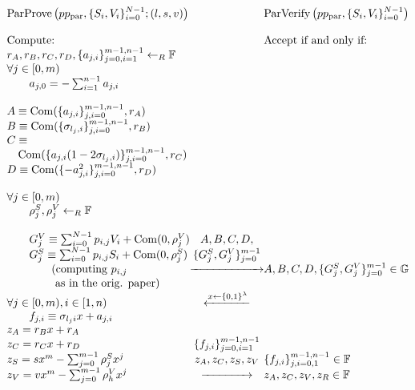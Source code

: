 \documentclass{llncs}
\newcommand{\G}{\mathbb{G}}
\newcommand{\F}{\mathbb{F}}
\newcommand{\com}{\operatorname{Com}}
\begin{document}
\begin{figure}
\centering
\begin{math}
\begin{array}{@{}l@{}c@{}l@{}}
\displaystyle \text{ParProve}\left(pp_{\text{par}}, \{S_i, V_i\}_{i=0}^{N-1}; (l,s,v)\right) && \text{ParVerify}\left(pp_{\text{par}}, \{S_i, V_i\}_{i=0}^{N-1}\right) \\\\
\text{Compute:} && \text{Accept if and only if:}\\
r_A, r_B, r_C, r_D, \{a_{j,i}\}_{j=0,i=1}^{m-1,n-1} \gets_R \F\\
\forall j \in [0,m) \\
\qquad a_{j,0} = -\sum _{i=1}^{n-1}a_{j,i}\\\\
A \equiv \com(\{a_{j,i}\}_{j,i=0}^{m-1,n-1}, r_A) \\
B \equiv \com(\{\sigma_{l_{j},i}\}_{j,i=0}^{m-1,n-1}, r_B) \\
C \equiv \\ \quad \com(\lbrace a_{j,i}(1-2\sigma_{l_j,i})\rbrace_{j,i=0}^{m-1,n-1}, r_C) \\
D \equiv \com(\{-a_{j,i}^2\}_{j,i=0}^{m-1,n-1}, r_D) \\\\
\forall j \in [0,m) &    \\
\qquad \rho^S_j, \rho^V_j \gets_R \F &\\\\

\qquad G^V_j \equiv \sum_{i=0}^{N-1}p_{i,j}V_i + \com(0, \rho^V_j )    &  A,B,C,D, & \\
\qquad G^S_j \equiv \sum_{i=0}^{N-1}p_{i,j}S_i + \com(0, \rho^S_j)& \lbrace G^S_j, G^V_j \rbrace_{j=0}^{m-1} \\
\qquad \qquad \text{(computing } p_{i,j}  & \xrightarrow{\qquad \qquad \qquad} & A, B, C, D, \{G^S_j, G^V_j\}_{j=0}^{m-1} \in \G \\
\qquad \qquad \text{ as in the orig. paper) } \\


\forall j \in [0,m), i \in [1,n) & \xleftarrow{x \gets \lbrace 0,1 \rbrace^\lambda} &  \\
\qquad f_{j,i} \equiv \sigma_{l_{j}i}x + a_{j,i} &&  \\
z_A = r_B x + r_A & \\
z_C = r_C x + r_D & \{f_{j,i}\}_{j=0,i=1}^{m-1,n-1}\\
z_S = sx^m -  \sum_{j=0}^{m-1}\rho^S_j x^j & z_A, z_C, z_S, z_V & \lbrace f_{j,i}\rbrace_{j,i =0,1}^{m-1,n-1} \in \F \\
z_V = vx^m - \sum_{j=0}^{m-1}\rho^V_h x^j &\xrightarrow{ \qquad \qquad } & z_A, z_C, z_V, z_R \in \F  \\


\end{array}
\end{math}
\end{figure}
\end{document}
